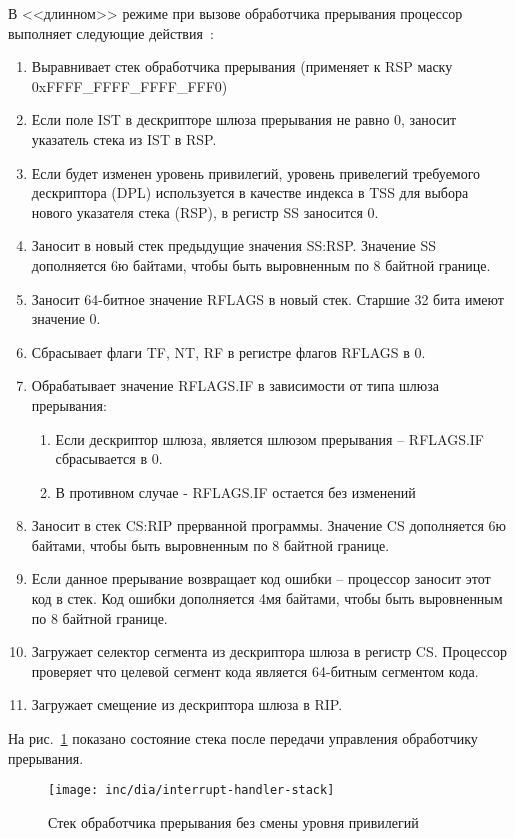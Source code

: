 В <<длинном>> режиме при вызове обработчика прерывания процессор выполняет
следующие действия~\cite{amd_pm_v2}:
\begin{enumerate}
\item Выравнивает стек обработчика прерывания (применяет к RSP маску 0xFFFF\_FFFF\_FFFF\_FFF0)
\item Если поле IST в дескрипторе шлюза прерывания не равно 0, заносит
	указатель стека из IST в RSP.
\item Если будет изменен уровень привилегий, уровень привелегий требуемого
	дескриптора (DPL) используется в качестве индекса в TSS для выбора
	нового указателя стека (RSP), в регистр SS заносится 0.
\item Заносит в новый стек предыдущие значения SS:RSP. Значение SS дополняется
	6ю байтами, чтобы быть выровненным по 8 байтной границе.
\item Заносит 64-битное значение RFLAGS в новый стек. Старшие 32 бита имеют
	значение 0.
\item Сбрасывает флаги TF, NT, RF в регистре флагов RFLAGS в 0.
\item Обрабатывает значение RFLAGS.IF в зависимости от типа шлюза прерывания:
	\begin{enumerate}
	\item Если дескриптор шлюза, является шлюзом прерывания -- RFLAGS.IF
		сбрасывается в 0.
	\item В противном случае - RFLAGS.IF остается без изменений
	\end{enumerate}
\item Заносит в стек CS:RIP прерванной программы. Значение CS дополняется 6ю
	байтами, чтобы быть выровненным по 8 байтной границе.
\item Если данное прерывание возвращает код ошибки -- процессор заносит этот
	код в стек. Код ошибки дополняется 4мя байтами, чтобы быть выровненным
	по 8 байтной границе.
\item Загружает селектор сегмента из дескриптора шлюза в регистр CS. Процессор
	проверяет что целевой сегмент кода является 64-битным сегментом кода.
\item Загружает смещение из дескриптора шлюза в RIP.
\end{enumerate}

На рис.~\ref{fig:interrupt_handler_stack} показано состояние стека после
передачи управления обработчику прерывания.

\begin{figure}
  \centering
  \texttt{[image: inc/dia/interrupt-handler-stack]}
  \caption{Стек обработчика прерывания без смены уровня привилегий}
  \label{fig:interrupt_handler_stack}
\end{figure}

